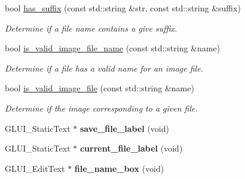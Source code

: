 \begin{DoxyCompactItemize}
\item 
bool \hyperlink{classimage__tools_1_1IOManager_ab8176a3f8684b1da88565a84c752494e}{has\+\_\+suffix} (const std\+::string \&str, const std\+::string \&suffix)
\begin{DoxyCompactList}\small\item\em Determine if a file name contains a give suffix. \end{DoxyCompactList}\item 
bool \hyperlink{classimage__tools_1_1IOManager_ac65d32aa03ea74c4c81d135a4e56f6fd}{is\+\_\+valid\+\_\+image\+\_\+file\+\_\+name} (const std\+::string \&name)
\begin{DoxyCompactList}\small\item\em Determine if a file has a valid name for an image file. \end{DoxyCompactList}\item 
bool \hyperlink{classimage__tools_1_1IOManager_af5559c30af4a3b2d1a86c6081d840170}{is\+\_\+valid\+\_\+image\+\_\+file} (const std\+::string \&name)
\begin{DoxyCompactList}\small\item\em Determine if the image corresponding to a given file. \end{DoxyCompactList}\item 
G\+L\+U\+I\+\_\+\+Static\+Text $\ast$ {\bfseries save\+\_\+file\+\_\+label} (void)\hypertarget{classimage__tools_1_1IOManager_a44ee0e7d400f05f1ebf992eb5faa6902}{}\label{classimage__tools_1_1IOManager_a44ee0e7d400f05f1ebf992eb5faa6902}

\item 
G\+L\+U\+I\+\_\+\+Static\+Text $\ast$ {\bfseries current\+\_\+file\+\_\+label} (void)\hypertarget{classimage__tools_1_1IOManager_a21fb95777da9b6b0059fe89bbac79666}{}\label{classimage__tools_1_1IOManager_a21fb95777da9b6b0059fe89bbac79666}

\item 
G\+L\+U\+I\+\_\+\+Edit\+Text $\ast$ {\bfseries file\+\_\+name\+\_\+box} (void)\hypertarget{classimage__tools_1_1IOManager_a1ffebca9d8453a19a051119f3d216784}{}\label{classimage__tools_1_1IOManager_a1ffebca9d8453a19a051119f3d216784}

\end{DoxyCompactItemize}
